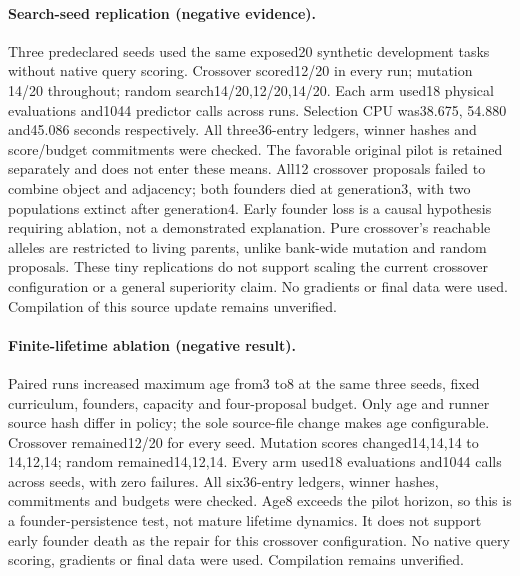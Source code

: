 \documentclass[11pt]{article}
\begin{document}
\paragraph{Search-seed replication (negative evidence).}
Three predeclared seeds used the same exposed20 synthetic development tasks
without native query scoring. Crossover scored12/20 in every run; mutation
14/20 throughout; random search14/20,12/20,14/20. Each arm used18 physical
evaluations and1044 predictor calls across runs. Selection CPU was38.675,
54.880 and45.086 seconds respectively. All three36-entry ledgers, winner hashes
and score/budget commitments were checked. The favorable original pilot is
retained separately and does not enter these means. All12 crossover proposals
failed to combine object and adjacency; both founders died at generation3,
with two populations extinct after generation4. Early founder loss is a causal
hypothesis requiring ablation, not a demonstrated explanation. Pure crossover's
reachable alleles are restricted to living parents, unlike bank-wide mutation
and random proposals. These tiny replications do not support scaling the current
crossover configuration or a general superiority claim. No gradients or final
data were used. Compilation of this source update remains unverified.
\paragraph{Finite-lifetime ablation (negative result).}
Paired runs increased maximum age from3 to8 at the same three seeds, fixed
curriculum, founders, capacity and four-proposal budget. Only age and runner
source hash differ in policy; the sole source-file change makes age configurable.
Crossover remained12/20 for every seed. Mutation scores changed14,14,14 to
14,12,14; random remained14,12,14. Every arm used18 evaluations and1044 calls
across seeds, with zero failures. All six36-entry ledgers, winner hashes,
commitments and budgets were checked. Age8 exceeds the pilot horizon, so this
is a founder-persistence test, not mature lifetime dynamics. It does not support
early founder death as the repair for this crossover configuration. No native
query scoring, gradients or final data were used. Compilation remains unverified.
\end{document}
